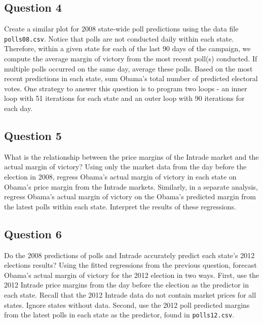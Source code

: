 \documentclass[]{article}
\begin{document}
\subsection{Question 4}\label{question-4}

Create a similar plot for 2008 state-wide poll predictions using the
data file \texttt{polls08.csv}. Notice that polls are not conducted
daily within each state. Therefore, within a given state for each of the
last 90 days of the campaign, we compute the average margin of victory
from the most recent poll(s) conducted. If multiple polls occurred on
the same day, average these polls. Based on the most recent predictions
in each state, sum Obama's total number of predicted electoral votes.
One strategy to answer this question is to program two loops - an inner
loop with 51 iterations for each state and an outer loop with 90
iterations for each day.

\subsection{Question 5}\label{question-5}

What is the relationship between the price margins of the Intrade market
and the actual margin of victory? Using only the market data from the
day before the election in 2008, regress Obama's actual margin of
victory in each state on Obama's price margin from the Intrade markets.
Similarly, in a separate analysis, regress Obama's actual margin of
victory on the Obama's predicted margin from the latest polls within
each state. Interpret the results of these regressions.

\subsection{Question 6}\label{question-6}

Do the 2008 predictions of polls and Intrade accurately predict each
state's 2012 elections results? Using the fitted regressions from the
previous question, forecast Obama's actual margin of victory for the
2012 election in two ways. First, use the 2012 Intrade price margins
from the day before the election as the predictor in each state. Recall
that the 2012 Intrade data do not contain market prices for all states.
Ignore states without data. Second, use the 2012 poll predicted margins
from the latest polls in each state as the predictor, found in
\texttt{polls12.csv}.
\end{document}
